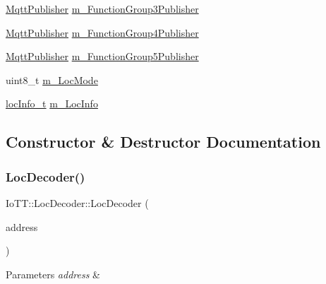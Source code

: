 \begin{DoxyCompactItemize}
\item 
\hyperlink{classIoTT_1_1MqttPublisher}{Mqtt\+Publisher} \hyperlink{classIoTT_1_1LocDecoder_abdfb7b2744d684440f4c6d8aba2b1e98}{m\+\_\+\+Function\+Group3\+Publisher}
\item 
\hyperlink{classIoTT_1_1MqttPublisher}{Mqtt\+Publisher} \hyperlink{classIoTT_1_1LocDecoder_a6a7e7bef4d5397197cefb6d9a0a52b4d}{m\+\_\+\+Function\+Group4\+Publisher}
\item 
\hyperlink{classIoTT_1_1MqttPublisher}{Mqtt\+Publisher} \hyperlink{classIoTT_1_1LocDecoder_ae126acd27bc87568558f599c94c8c17f}{m\+\_\+\+Function\+Group5\+Publisher}
\item 
uint8\+\_\+t \hyperlink{classIoTT_1_1LocDecoder_a71b48ceda04b004ea181d9c9425ce9de}{m\+\_\+\+Loc\+Mode}
\item 
\hyperlink{structIoTT_1_1LocDecoder_1_1locInfo__t}{loc\+Info\+\_\+t} \hyperlink{classIoTT_1_1LocDecoder_a6f6ddbd212e97fb46a23741a0da19c90}{m\+\_\+\+Loc\+Info}
\end{DoxyCompactItemize}


\subsection{Constructor \& Destructor Documentation}
\mbox{\label{classIoTT_1_1LocDecoder_a9643de201baffeecfe14f26fdd1105e5}} 
\subsubsection{\texorpdfstring{Loc\+Decoder()}{LocDecoder()}}
{\footnotesize\ttfamily Io\+T\+T\+::\+Loc\+Decoder\+::\+Loc\+Decoder (\begin{DoxyParamCaption}\item[{const \hyperlink{namespaceIoTT_a31b8cd9473fc447b3fb341b78afa54fe}{D\+C\+C\+Address\+\_\+t} \&}]{address }\end{DoxyParamCaption})}


\begin{DoxyParams}{Parameters}
{\em address} & \\
\hline
\end{DoxyParams}
\mbox{\label{classIoTT_1_1LocDecoder_aafbfe84b5303dd6155d55aa277e1751f}} 
